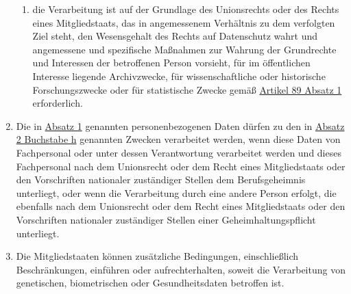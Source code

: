 \begin{enumerate}
\begin{enumerate}
    \item die Verarbeitung ist auf der Grundlage des Unionsrechts oder des Rechts eines Mitgliedstaats, das in
     angemessenem Verhältnis zu dem verfolgten Ziel steht, den Wesensgehalt des Rechts auf Datenschutz wahrt und
     angemessene und spezifische Maßnahmen zur Wahrung der Grundrechte und Interessen der betroffenen Person vorsieht,
     für im öffentlichen Interesse liegende Archivzwecke, für wissenschaftliche oder historische Forschungszwecke oder
     für statistische Zwecke gemäß \hyperref[itm:89-1]{Artikel 89 Absatz 1} erforderlich.
    \label{itm:09-2j}

  \end{enumerate}

  \item Die in \hyperref[itm:09-1]{Absatz 1} genannten personenbezogenen Daten dürfen zu den in \hyperref[itm:09-2h]
   {Absatz 2 Buchstabe h} genannten Zwecken verarbeitet werden, wenn diese Daten von Fachpersonal oder unter dessen
   Verantwortung verarbeitet werden und dieses Fachpersonal nach dem Unionsrecht oder dem Recht eines Mitgliedstaats
   oder den Vorschriften nationaler zuständiger Stellen dem Berufsgeheimnis unterliegt, oder wenn die Verarbeitung
   durch eine andere Person erfolgt, die ebenfalls nach dem Unionsrecht oder dem Recht eines Mitgliedstaats oder den
   Vorschriften nationaler zuständiger Stellen einer Geheimhaltungspflicht unterliegt.
  \label{itm:09-3}

  \item Die Mitgliedstaaten können zusätzliche Bedingungen, einschließlich Beschränkungen, einführen oder
   aufrechterhalten, soweit die Verarbeitung von genetischen, biometrischen oder Gesundheitsdaten betroffen ist.
  \label{itm:09-4}

\end{enumerate}



